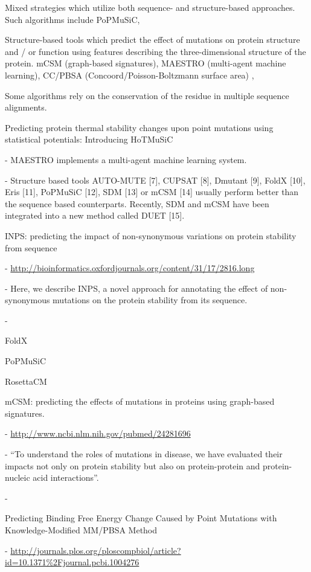 Mixed strategies which utilize both sequence- and structure-based approaches. Such algorithms include PoPMuSiC,

Structure-based tools which predict the effect of mutations on protein structure and / or function using features describing the three-dimensional structure of the protein. mCSM \cite{pires_mcsm:_2014} (graph-based signatures), MAESTRO \cite{laimer_maestro_2015} (multi-agent machine learning), CC/PBSA (Concoord/Poisson-Boltzmann surface area) \cite{benedix_predicting_2009},

Some algorithms rely on the conservation of the residue in multiple sequence alignments.

Predicting protein thermal stability changes upon point mutations using statistical potentials: Introducing HoTMuSiC

  - MAESTRO implements a multi-agent machine learning system.

  - Structure based tools AUTO-MUTE [7], CUPSAT [8], Dmutant [9], FoldX [10], Eris [11], PoPMuSiC [12], SDM [13] or mCSM [14] usually perform better than the sequence based counterparts. Recently, SDM and mCSM have been integrated into a new method called DUET [15].

INPS: predicting the impact of non-synonymous variations on protein stability from sequence

  - \url{http://bioinformatics.oxfordjournals.org/content/31/17/2816.long}

  - Here, we describe INPS, a novel approach for annotating the effect of non-synonymous mutations on the protein stability from its sequence.

  - \cite{fariselli_inps:_2015}

FoldX

PoPMuSiC

RosettaCM

mCSM: predicting the effects of mutations in proteins using graph-based signatures.

  - \url{http://www.ncbi.nlm.nih.gov/pubmed/24281696}

  - ``To understand the roles of mutations in disease, we have evaluated their impacts not only on protein stability but also on protein-protein and protein-nucleic acid interactions''.

  - \cite{pires_mcsm:_2014}


Predicting Binding Free Energy Change Caused by Point Mutations with Knowledge-Modified MM/PBSA Method

  - \url{http://journals.plos.org/ploscompbiol/article?id=10.1371%2Fjournal.pcbi.1004276}

